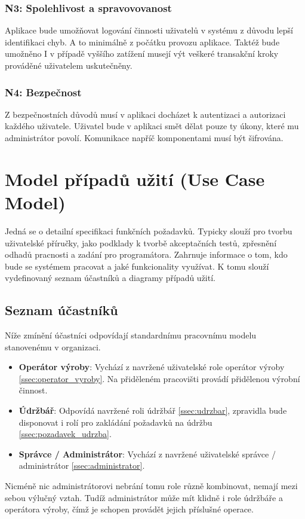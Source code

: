 \documentclass[thesis=M,czech]{FITthesis}[2012/06/26]
\begin{document}
\subsubsection{N3: Spolehlivost a spravovovanost}
Aplikace bude umožňovat logování činnosti uživatelů v systému z důvodu lepší identifikaci chyb. A to minimálně z počátku provozu aplikace. Taktéž bude umožněno I v případě vyššího zatížení musejí výt veškeré transakční kroky prováděné uživatelem uskutečněny.
\subsubsection{N4: Bezpečnost}
Z bezpečnostních důvodů musí v aplikaci docházet k autentizaci a autorizaci každého uživatele. Uživatel bude v aplikaci smět dělat pouze ty úkony, které mu administrátor povolí. Komunikace napříč komponentami musí být šifrována.

\section{Model případů užití (Use Case Model)}
Jedná se o detailní specifikaci funkčních požadavků. Typicky slouží pro tvorbu uživatelské příručky, jako podklady k tvorbě akceptačních testů, zpřesnění odhadů pracnosti a zadání pro programátora. Zahrnuje informace o tom, kdo bude se systémem pracovat a jaké funkcionality využívat. K tomu slouží vydefinovaný seznam účastníků a diagramy případů užití.

\subsection{Seznam účastníků}
\label{ssec:seznam_ucastniku}
Níže zmínění účastníci odpovídají standardnímu pracovnímu modelu stanovenému v organizaci.
\begin{itemize}
	\item
	\textbf{Operátor výroby}: Vychází z navržené uživatelské role operátor výroby \ref{ssec:operator_vyroby}. Na přiděleném pracovišti provádí přidělenou výrobní činnost. 
	\item
	\textbf{Údržbář}: Odpovídá navržené roli údržbář \ref{ssec:udrzbar}, zpravidla bude disponovat i rolí pro zakládání požadavků na údržbu \ref{ssec:pozadavek_udrzba}. 
	\item
	\textbf{Správce / Administrátor}: Vychází z navržené uživatelské správce / administrátor \ref{ssec:administrator}.
\end{itemize} 	
Nicméně nic administrátorovi nebrání tomu role různě kombinovat, nemají mezi sebou výlučný vztah. Tudíž administrátor může mít klidně i role údržbáře a operátora výroby, čímž je schopen provádět jejich příslušné operace.
\end{document}
